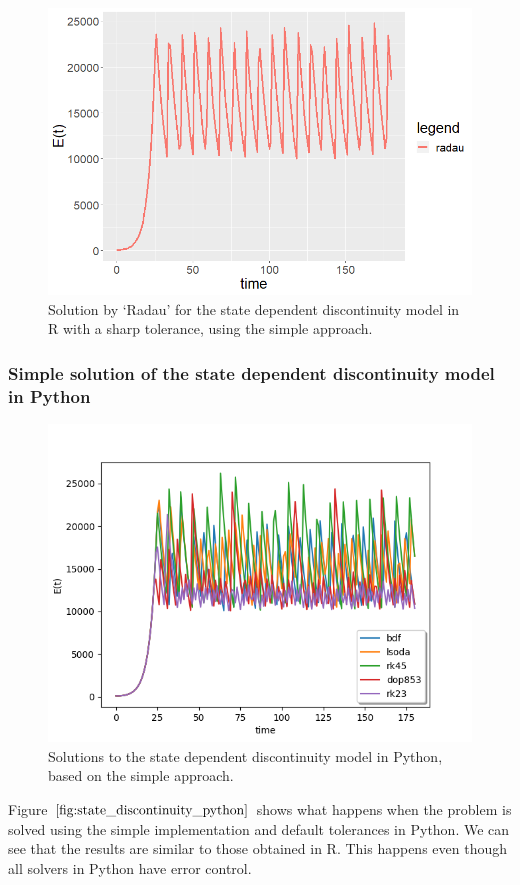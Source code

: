 \begin{figure}[H]
\centering
\includegraphics[width=0.7\linewidth]{./figures/state_discontinuity_sharp_radau_R}
\caption{Solution by `Radau' for the state dependent discontinuity model in R with a sharp tolerance, using the simple approach.}
\label{fig:state_discontinuity_radau_sharp_R}
\end{figure}

\subsubsection{Simple solution of the state dependent discontinuity model in Python}
\begin{figure}[H]
\centering
\includegraphics[width=0.7\linewidth]{./figures/state_discontinuity_py}
\caption{Solutions to the state dependent discontinuity model in Python, based on the simple approach.}
\label{fig:state_discontinuity_python}
\end{figure}
Figure $\ref{fig:state_discontinuity_python}$ shows what happens when the problem is solved using the simple implementation and default tolerances in Python. We can see that the results are similar to those obtained in R. This happens even though all solvers in Python have error control.

